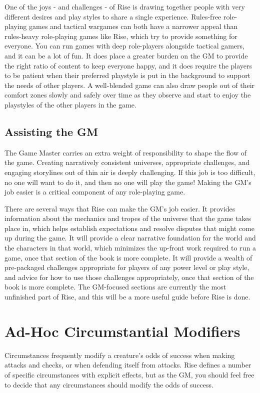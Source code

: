     One of the joys - and challenges - of Rise is drawing together people with very different desires and play styles to share a single experience.
    Rules-free role-playing games and tactical wargames can both have a narrower appeal than rules-heavy role-playing games like Rise, which try to provide something for everyone.
    You can run games with deep role-players alongside tactical gamers, and it can be a lot of fun.
    It does place a greater burden on the GM to provide the right ratio of content to keep everyone happy, and it does require the players to be patient when their preferred playstyle is put in the background to support the needs of other players.
    A well-blended game can also draw people out of their comfort zones slowly and safely over time as they observe and start to enjoy the playstyles of the other players in the game.

  \subsection{Assisting the GM}
    The Game Master carries an extra weight of responsibility to shape the flow of the game.
    Creating narratively consistent universes, appropriate challenges, and engaging storylines out of thin air is deeply challenging.
    If this job is too difficult, no one will want to do it, and then no one will play the game!
    Making the GM's job easier is a critical component of any role-playing game.

    There are several ways that Rise can make the GM's job easier.
    It provides information about the mechanics and tropes of the universe that the game takes place in, which helps establish expectations and resolve disputes that might come up during the game.
    It will provide a clear narrative foundation for the world and the characters in that world, which minimizes the up-front work required to run a game, once that section of the book is more complete.
    It will provide a wealth of pre-packaged challenges appropriate for players of any power level or play style, and advice for how to use those challenges appropriately, once that section of the book is more complete.
    The GM-focused sections are currently the most unfinished part of Rise, and this will be a more useful guide before Rise is done.

\section{Ad-Hoc Circumstantial Modifiers}
  Circumstances frequently modify a creature's odds of success when making attacks and checks, or when defending itself from attacks.
  Rise defines a number of specific circumstances with explicit effects, but as the GM, you should feel free to decide that any circumstances should modify the odds of success.

